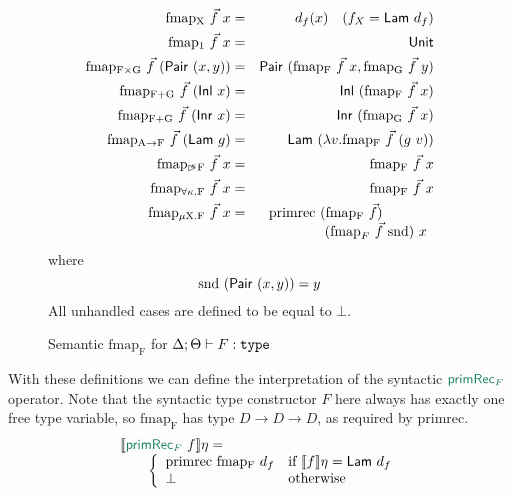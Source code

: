\begin{figure}[t]
  \begin{eqnarray*}
    \mathrm{fmap_X}\ \vec{f}\ x & = & d_f(x)\quad (f_X = \semCons{Lam}\ d_f) \\
    \mathrm{fmap_1}\ \vec{f}\ x & = & \semCons{Unit} \\
    \mathrm{fmap_{F \times G}}\ \vec{f}\ (\semCons{Pair}\ (x,y)) & = & \semCons{Pair}\ (\mathrm{fmap_F}\ \vec{f}\ x, \mathrm{fmap_G}\ \vec{f}\ y) \\
    \mathrm{fmap_{F + G}}\ \vec{f}\ (\semCons{Inl}\ x) & = & \semCons{Inl}\ (\mathrm{fmap_F}\ \vec{f}\ x) \\
    \mathrm{fmap_{F + G}}\ \vec{f}\ (\semCons{Inr}\ x) & = & \semCons{Inr}\ (\mathrm{fmap_G}\ \vec{f}\ x) \\
    \mathrm{fmap_{A \to F}}\ \vec{f}\ (\semCons{Lam}\ g) & = & \semCons{Lam}\ (\lambda v. \mathrm{fmap_F}\ \vec{f}\ (g\ v)) \\
    \mathrm{fmap_{\delay\kappa F}}\ \vec{f}\ x & = & \mathrm{fmap_F}\ \vec{f}\ x \\
    \mathrm{fmap_{\forall\kappa.F}}\ \vec{f}\ x & = & \mathrm{fmap_F}\ \vec{f}\ x \\
    \mathrm{fmap_{\mu X. F}}\ \vec{f}\ x & = &
    \begin{array}[t]{l}
      \mathrm{primrec}\ (\mathrm{fmap_F}\ \vec{f})\ \\
      \quad\quad\quad\quad(\mathrm{fmap}_F\ \vec{f}\ \mathrm{snd})\ x
    \end{array}
  \end{eqnarray*}
  where
  \begin{displaymath}
    \mathrm{snd}\ (\semCons{Pair}\ (x,y)) = y
  \end{displaymath}
  All unhandled cases are defined to be equal to $\bot$.
  \caption{Semantic $\mathrm{fmap_F}$ for $\Delta; \Theta \vdash F : \texttt{type}$}
  \label{fig:semantic-fmap}
\end{figure}

With these definitions we can define the interpretation of the
syntactic $\elim{primRec$_F$}$ operator. Note that the syntactic type
constructor $F$ here always has exactly one free type variable, so
$\mathrm{fmap_F}$ has type $D \to D \to D$, as required by
$\mathrm{primrec}$.
\begin{displaymath}
  \begin{array}{l}
    \sem{\elim{primRec$_F$}\ f}\eta = \\
    \quad\quad\left\{
      \begin{array}{ll}
        \mathrm{primrec}\ \mathrm{fmap_F}\ d_f & \textrm{if }\sem{f}\eta = \semCons{Lam}\ d_f \\
        \bot & \textrm{otherwise}
      \end{array}
    \right.
  \end{array}
\end{displaymath}

